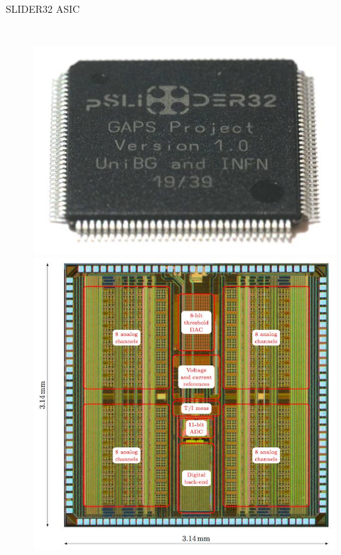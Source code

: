 \documentclass[aspectratio=169,xcolor=dvipsnames,handout]{beamer} %
\begin{document}
\begin{frame}{SLIDER32 ASIC}
\begin{columns}
        \begin{figure}
        \centering
        \vspace{-0.25cm}
        \includegraphics[height=0.2\textheight]{images/backup_slides/SLIDER32_asic_package.jpg}
        \vspace{0.2cm}
        \vskip0.001cm
        \includegraphics[height=0.5\textheight]{images/experiment_intro/gaps_asic_circuit.jpg}
        \end{figure}
    \end{columns}
\end{frame}
\end{document}
